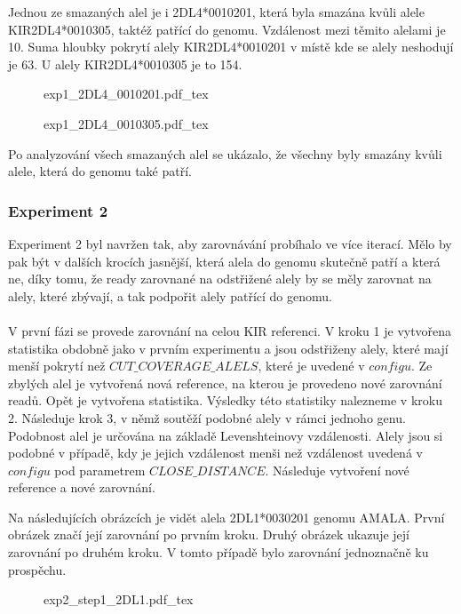 \documentclass[czech,DP]{thesiskiv}
\numberwithin{equation}{section}
\begin{document}
\noindent
Jednou ze smazaných alel je i 2DL4*0010201, která byla smazána kvůli alele KIR2DL4*0010305, taktéž patřící do genomu. Vzdálenost mezi těmito alelami je 10. Suma hloubky pokrytí alely KIR2DL4*0010201 v místě kde se alely neshodují je 63. U alely KIR2DL4*0010305 je to 154. 


\begin{figure}[H]
	\centering
    \def\svgwidth{\columnwidth}
    {exp1_2DL4_0010201.pdf_tex} 
\end{figure}

\begin{figure}[H]
	\centering
    \def\svgwidth{\columnwidth}
    {exp1_2DL4_0010305.pdf_tex} 
\end{figure}

\noindent
Po analyzování všech smazaných alel se ukázalo, že všechny byly smazány kvůli alele, která do genomu také patří.

\subsubsection{Experiment 2}
Experiment 2 byl navržen tak, aby zarovnávání probíhalo ve více iterací. Mělo by pak být v dalších krocích jasnější, která alela do genomu skutečně patří a která ne, díky tomu, že ready zarovnané na odstřižené alely by se měly zarovnat na alely, které zbývají, a tak podpořit alely patřící do genomu. 
\\
\\
V první fázi se provede zarovnání na celou KIR referenci. V kroku 1 je vytvořena statistika obdobně jako v prvním experimentu a jsou odstřiženy alely, které mají menší pokrytí než $CUT\_COVERAGE\_ALELS$, které je uvedené v $configu$. Ze zbylých alel je vytvořená nová reference, na kterou je provedeno nové zarovnání readů. Opět je vytvořena statistika. Výsledky této statistiky nalezneme v kroku 2. Následuje krok 3, v němž soutěží podobné alely v rámci jednoho genu. Podobnost alel je určována na základě Levenshteinovy vzdálenosti. Alely jsou si podobné v případě, kdy je jejich vzdálenost menši než vzdálenost uvedená v $configu$ pod parametrem $CLOSE\_DISTANCE$. Následuje vytvoření nové reference a nové zarovnání.  


\noindent
Na následujících obrázcích je vidět alela 2DL1*0030201 genomu AMALA. První obrázek značí její zarovnání po prvním kroku. Druhý obrázek ukazuje její zarovnání po druhém kroku. V tomto případě bylo zarovnání jednoznačně ku prospěchu.

\begin{figure}[H]
	\centering
    \def\svgwidth{\columnwidth}
    {exp2_step1_2DL1.pdf_tex} 
\end{figure}
\end{document}
